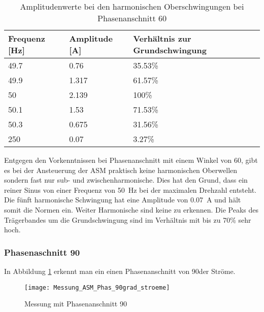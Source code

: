 \begin{table}[ht!]
	\centering
	\begin{tabular}{|l|l|l|}
		\hline
		Frequenz {[}Hz{]} & Amplitude {[}A{]} & Verhältnis zur Grundschwingung	\\ \hline
		49.7              & 0.76              & 35.53\%							\\ \hline
		49.9              & 1.317             & 61.57\%							\\ \hline
		50                & 2.139             & 100\%							\\ \hline
		50.1              & 1.53              & 71.53\%							\\ \hline
		50.3              & 0.675             & 31.56\%							\\ \hline
		250               & 0.07              & 3.27\%							\\ \hline
	\end{tabular}
	\caption{Amplitudenwerte bei den harmonischen Oberschwingungen bei Phasenanschnitt 60\textdegree}\label{tab:Phas_60_ASM_stroeme}
\end{table}
Entgegen den Vorkenntnissen bei Phasenanschnitt mit einem Winkel von 60\textdegree, gibt es bei der Ansteuerung der ASM praktisch keine harmonischen Oberwellen sondern fast nur sub- und zwischenharmonische. Dies hat den Grund, dass ein reiner Sinus von einer Frequenz von \SI{50}{Hz} bei der maximalen Drehzahl entsteht. Die fünft harmonische Schwingung hat eine Amplitude von \SI{0.07}{A} und hält somit die Normen ein. Weiter Harmonische sind keine zu erkennen. Die Peaks des Trägerbandes um die Grundschwingung sind im Verhältnis mit bis zu 70\% sehr hoch.

\newpage
\subsubsection*{Phasenaschnitt 90\textdegree}

In Abbildung \ref{fig:Mess_Phas_90grad_stroeme} erkennt man ein einen Phasenanschnitt von 90\textdegree der Ströme.

\begin{figure}[ht!]
	\centering
	\texttt{[image: Messung\_ASM\_Phas\_90grad\_stroeme]}	
	\caption{Messung mit Phasenanschnitt 90\textdegree}\label{fig:Mess_Phas_90grad_stroeme}
\end{figure}

